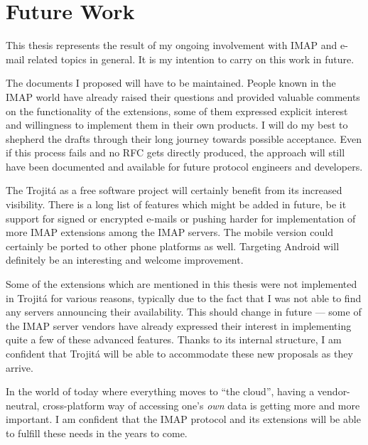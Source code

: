 \documentclass[trojita]{subfiles}
\begin{document}
\section{Future Work}
\label{sec:future-work}

This thesis represents the result of my ongoing involvement with IMAP and e-mail related topics in general.  It is my
intention to carry on this work in future.

The documents I proposed will have to be maintained.  People known in the IMAP world have already raised their questions
and provided valuable comments on the functionality of the extensions, some of them expressed explicit interest and
willingness to implement them in their own products.  I will do my best to shepherd the drafts through their long
journey towards possible acceptance.  Even if this process fails and no RFC gets directly produced, the approach will
still have been documented and available for future protocol engineers and developers.

The Trojitá as a free software project will certainly benefit from its increased visibility.  There is a long list of
features which might be added in future, be it support for signed or encrypted e-mails or pushing harder for
implementation of more IMAP extensions among the IMAP servers.  The mobile version could certainly be ported to other
phone platforms as well.  Targeting Android will definitely be an interesting and welcome improvement.

Some of the extensions which are mentioned in this thesis were not implemented in Trojitá for various reasons, typically
due to the fact that I was not able to find any servers announcing their availability.  This should change in future ---
some of the IMAP server vendors have already expressed their interest in implementing quite a few of these advanced
features.  Thanks to its internal structure, I am confident that Trojitá will be able to accommodate these new proposals
as they arrive.

In the world of today where everything moves to ``the cloud'', having a vendor-neutral, cross-platform way of accessing
one's {\em own} data is getting more and more important.  I am confident that the IMAP protocol and its extensions will
be able to fulfill these needs in the years to come.
\end{document}
